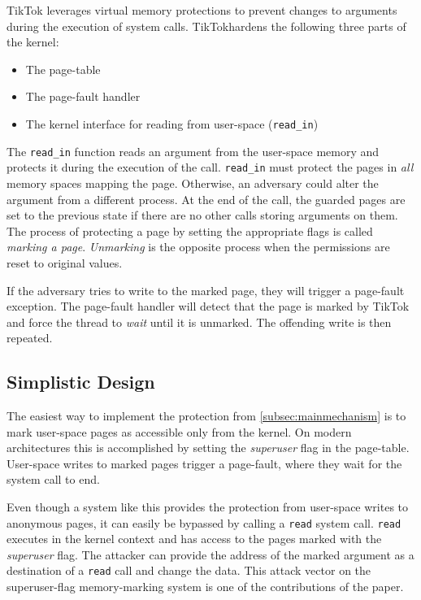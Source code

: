 \documentclass[conference]{IEEEtran}
\newcommand{\sysname}{TikTok}
\begin{document}
\sysname{} leverages virtual memory protections to
prevent changes to arguments during the execution of system calls.
\sysname hardens the following three parts of the kernel:

\begin{itemize}
\item The page-table
\item The page-fault handler
\item The kernel interface for reading from user-space (\texttt{read\_in})
\end{itemize}

The \texttt{read\_in} function reads an argument from the user-space memory and
protects it during the execution of the call. \texttt{read\_in} must protect the
pages in \emph{all} memory spaces mapping the page. Otherwise, an adversary
could alter the argument from a different process. At the end of the call, the
guarded pages are set to the previous state if there are no other calls storing
arguments on them. The process of protecting a page by setting the appropriate
flags is called \emph{marking a page}. \emph{Unmarking} is the opposite process
when the permissions are reset to original values.

If the adversary tries to write to the marked page, they will trigger a
page-fault exception. The page-fault handler will detect that the page is marked
by \sysname{} and force the thread to \emph{wait} until it is unmarked. The
offending write is then repeated. 


\subsection{Simplistic Design}
\label{subsec:simplistic}
 The easiest way to implement the
protection from \autoref{subsec:mainmechanism} is to mark user-space pages as
accessible only from the kernel.  On modern architectures this is accomplished
by setting the \emph{superuser} flag in the page-table. User-space writes to
marked pages trigger a page-fault, where they wait for the system call to end.

Even though a system like this provides the protection from user-space
writes to anonymous pages, it can easily be bypassed by calling a \texttt{read}
system call. \texttt{read} executes in the kernel context and has access to 
the pages marked with the \emph{superuser} flag. The attacker can provide the
address of the marked argument as a destination of a \texttt{read} call and 
change the data. This attack vector on the superuser-flag memory-marking system
is one of the contributions of the paper.
\end{document}

